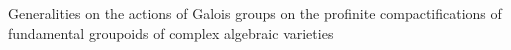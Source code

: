Generalities on the actions of Galois groups on the profinite compactifications of fundamental groupoids of complex algebraic varieties
